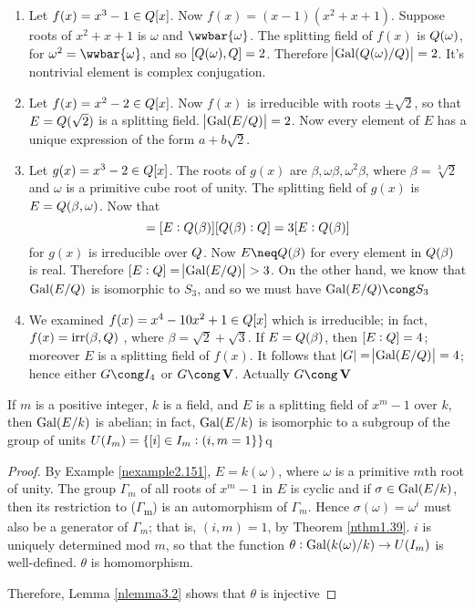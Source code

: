 \documentclass[11pt]{article}
\begin{document}
\begin{examplle}[]
\begin{enumerate}
\item Let \(f(x)=x^3-1\in\relax{Q}[x]\). Now \(f(x)=(x-1)(x^2+x+1)\). Suppose roots of
\(x^2+x+1\) is \(\omega\) and \(\wwbar{\omega}\). The splitting field of
\(f(x)\) is \(\relax{Q}(\omega)\), for \(\omega^2=\wwbar{\omega}\), and so \([\relax{Q}(\omega),\relax{Q}]=2\).
Therefore \(\abs{\operatorname{Gal}(\relax{Q}(\omega)/\relax{Q})}=2\). It's nontrivial element is complex conjugation.
\item Let \(f(x)=x^2-2\in\relax{Q}[x]\). Now \(f(x)\) is irreducible with roots
\(\pm\sqrt{2}\), so that \(E=\relax{Q}(\sqrt{2})\) is a splitting field.
\(\abs{\operatorname{Gal}(E/\relax{Q})}=2\). Now every element of \(E\) has a unique expression
of the form \(a+b\sqrt{2}\).
\item Let \(g(x)=x^3-2\in\relax{Q}[x]\). The roots of \(g(x)\) are
\(\beta,\omega\beta,\omega^2\beta\), where \(\beta=\sqrt[3]{2}\) and \(\omega\) is a
primitive cube root of unity. The splitting field of \(g(x)\) is
\(E=\relax{Q}(\beta,\omega)\). Now that 
\begin{equation*}
[E:\Q]=[E:\Q(\beta)][\Q(\beta):\Q]=3[E:\Q(\beta)]
\end{equation*}
for \(g(x)\) is irreducible over \(\relax{Q}\). Now \(E\neq\Q(\beta)\) for every
element in \(\relax{Q}(\beta)\) is real. Therefore \([E:\relax{Q}]=\abs{\operatorname{Gal}(E/\relax{Q})}>3\). On the
other hand, we know that \(\operatorname{Gal}(E/\relax{Q})\) is isomorphic to \(S_3\), and so
we must have \(\Gal(E/\Q)\cong S_3\)
\item We examined \(f(x)=x^4-10x^2+1\in\relax{Q}[x]\) which is irreducible; in fact,
\(f(x)=\operatorname{irr}(\beta,\relax{Q})\) , where \(\beta=\sqrt{2}+\sqrt{3}\). If \(E=\relax{Q}(\beta)\),
then \([E:\relax{Q}]=4\); moreover \(E\) is a splitting field of \(f(x)\). It follows
that \(\abs{G}=\abs{\operatorname{Gal}(E/\relax{Q})}=4\); hence either \(G\cong\I_4\) or
\(G\cong\bV\). Actually \(G\cong\bV\)
\end{enumerate}
\end{examplle}

\begin{proposition}[]
\label{nprop3.12}
If \(m\) is a positive integer, \(k\) is a field, and \(E\) is a splitting field of
\(x^m-1\) over \(k\), then \(\operatorname{Gal}(E/k)\) is abelian; in fact, \(\operatorname{Gal}(E/k)\) is
isomorphic to a subgroup of the group of units \(U(\relax{I}_m)=\{[i]\in\relax{I}_m:(i,m=1\}\}\)q
\end{proposition}

\begin{proof}
By Example \ref{nexample2.151}, \(E=k(\omega)\), where \(\omega\) is a primitive \(m\)th root
of unity. The group \(\Gamma_m\) of all roots of \(x^m-1\) in \(E\) is cyclic
and if \(\sigma\in\operatorname{Gal}(E/k)\), then its restriction to (\(\Gamma\)\textsubscript{m}) is an
automorphism of \(\Gamma_m\). Hence \(\sigma(\omega)=\omega^i\) must also be a
generator of \(\Gamma_m\); that is, \((i,m)=1\), by Theorem \ref{nthm1.39}. \(i\)
is uniquely determined mod \(m\), so that the function 
\(\theta:\operatorname{Gal}(k(\omega)/k)\to U(\relax{I}_m)\) is well-defined. \(\theta\) is homomorphism.

Therefore, Lemma \ref{nlemma3.2} shows that \(\theta\) is injective
\end{proof}
\end{document}
